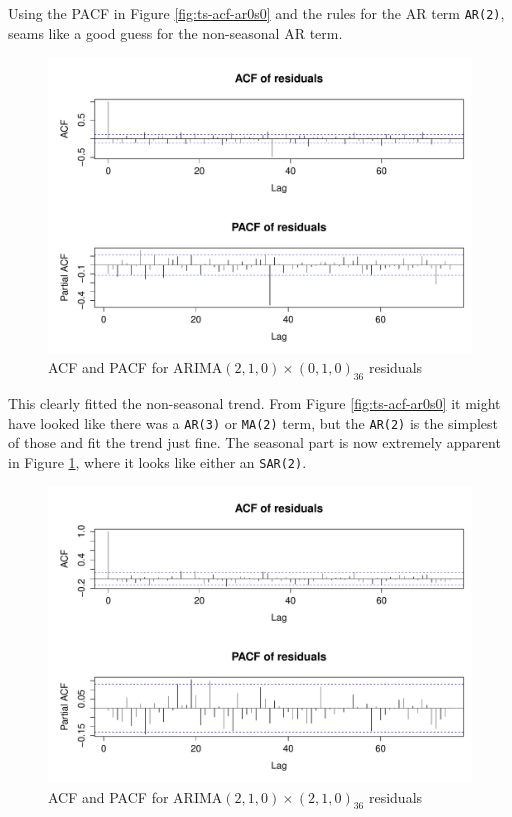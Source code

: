 Using the PACF in Figure \ref{fig:ts-acf-ar0s0} and the rules for the AR term \cite[Table~6.1]{time-series-analysis} \texttt{AR(2)}, seams like a good guess for the non-seasonal AR term.
\begin{figure}[H]
	\centering
	\includegraphics[width=\textwidth]{figures/ts-acf-ar2s0}
	\caption{ACF and PACF for ARIMA$(2,1,0) \times (0,1,0)_{36}$ residuals}
	\label{fig:ts-acf-ar2s0}
\end{figure}

This clearly fitted the non-seasonal trend. From Figure \ref{fig:ts-acf-ar0s0} it might have looked like there was a \texttt{AR(3)} or \texttt{MA(2)} term, but the \texttt{AR(2)} is the simplest of those and fit the trend just fine. The seasonal part is now extremely apparent in Figure \ref{fig:ts-acf-ar2s0}, where it looks like either an \texttt{SAR(2)}.
\begin{figure}[H]
	\centering
	\includegraphics[width=\textwidth]{figures/ts-acf-ar2s2}
	\caption{ACF and PACF for ARIMA$(2,1,0) \times (2,1,0)_{36}$ residuals}
	\label{fig:ts-acf-ar2s2}
\end{figure}

